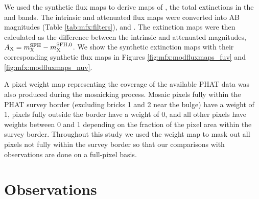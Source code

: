 \documentclass[iop, tighten]{emulateapj}
\begin{document}
We used the synthetic flux maps to derive maps of \ax{}, the total extinctions
in the \fuv{} and \nuv{} bands. The intrinsic and attenuated flux maps were
converted into AB magnitudes (Table \ref{tab:mfx:filters}), \xsfhz{} and
\xsfh{}. The extinction maps were then calculated as the difference between the
intrinsic and attenuated magnitudes, $A_{\mathrm{X}} = m_{\mathrm{X}}^{\mathrm{SFH}} - m_{\mathrm{X}}^{\mathrm{SFH},0}$. We show the
synthetic extinction maps with their corresponding synthetic flux maps in
Figures \ref{fig:mfx:modfluxmaps_fuv} and \ref{fig:mfx:modfluxmaps_nuv}.

A pixel weight map representing the coverage of the available PHAT data was
also produced during the mosaicking process. Mosaic pixels fully within the
PHAT survey border (excluding bricks 1 and 2 near the bulge) have a weight of
1, pixels fully outside the border have a weight of 0, and all other pixels
have weights between 0 and 1 depending on the fraction of the pixel area within
the survey border. Throughout this study we used the weight map to mask out all
pixels not fully within the survey border so that our comparisons with
observations are done on a full-pixel basis.

%
%





\section{Observations}\label{mfx:observations}
\end{document}
